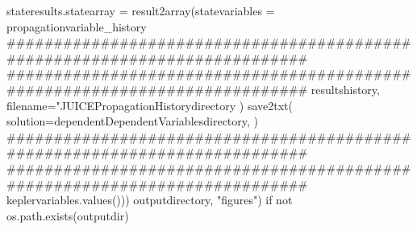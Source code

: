 {}stateresults.statearray = result2array(statevariables = propagationvariable_history\markdownRendererInterblockSeparator
{}###########################################################################\markdownRendererInterblockSeparator
{}
\markdownRendererSectionEnd \markdownRendererSectionBegin
{}\markdownRendererInterblockSeparator
{}########################################################################### resultshistory, filename="JUICEPropagationHistorydirectory ) save2txt( solution=dependentDependentVariablesdirectory, )\markdownRendererInterblockSeparator
{}###########################################################################\markdownRendererInterblockSeparator
{}
\markdownRendererSectionEnd \markdownRendererSectionBegin
{}\markdownRendererInterblockSeparator
{}###########################################################################\markdownRendererInterblockSeparator
{}
\markdownRendererSectionEnd \markdownRendererSectionBegin
{}\markdownRendererInterblockSeparator
{}keplervariables.values()))\markdownRendererInterblockSeparator
{}
\markdownRendererSectionEnd \markdownRendererSectionBegin
{}\markdownRendererInterblockSeparator
{}
\markdownRendererSectionEnd \markdownRendererSectionBegin
{}\markdownRendererInterblockSeparator
{}outputdirectory, "figures") if not os.path.exists(outputdir)\markdownRendererInterblockSeparator
{}
\markdownRendererSectionEnd \markdownRendererSectionBegin
{}\markdownRendererInterblockSeparator
{}
\markdownRendererSectionEnd \markdownRendererSectionBegin
{}\markdownRendererInterblockSeparator
